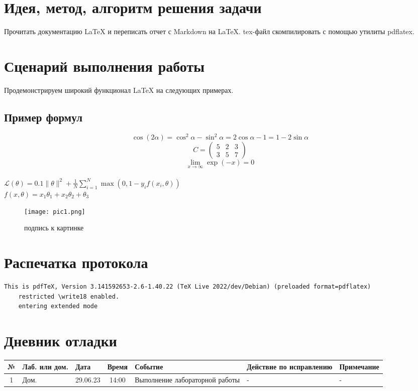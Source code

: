 \documentclass[12pt, letterpaper]{article}
\begin{document}
\section{Идея, метод, алгоритм решения задачи}
Прочитать документацию \LaTeX{} и переписать отчет с Markdown на \LaTeX{}. tex-файл скомпилировать с помощью утилиты pdflatex.
\section{Сценарий выполнения работы}
Продемонстрируем широкий функционал \LaTeX{} на следующих примерах.
\subsection{Пример формул}
\[\cos (2\alpha) = \cos^2 \alpha - \sin^2 \alpha = 2\cos\alpha - 1 = 1 - 2\sin\alpha\]
\[C=
\begin{pmatrix}
5 & 2 & 3\\
3 & 5 & 7
\end{pmatrix}\]
\[
\lim\limits_{x \to \infty} \exp(-x) = 0
\] \\
$\mathcal{L}(\theta) = 0.1 \|\theta\|^2 + \frac{1}{N}\sum\limits_{i=1}^N \max(0, 1 - y_i f(x_i, \theta))$ \\
$f(x, \theta) = x_1 \theta_1 + x_2 \theta_2 + \theta_3$ \\
\begin{figure}[h]
\centering
\texttt{[image: pic1.png]}
\caption{ подпись к картинке}
\label{fig:mpr}
\end{figure}
\section{Распечатка протокола}
\begin{lstlisting}[breaklines]
    This is pdfTeX, Version 3.141592653-2.6-1.40.22 (TeX Live 2022/dev/Debian) (preloaded format=pdflatex)
    restricted \write18 enabled.
    entering extended mode
\end{lstlisting}  
\section{Дневник отладки}
\begin{tabular}{|c|p{1cm}|p{1.5cm}|c|p{2.5cm}|p{2cm}|p{2.25cm}|}
    \hline
    № & Лаб. или дом. & Дата & Время & Событие & Действие по исправлению & Примечание\\
    \hline
    1 & Дом. & 29.06.23 & 14:00 & Выполнение лабораторной работы & - & -\\
    \hline
\end{tabular}
\end{document}

